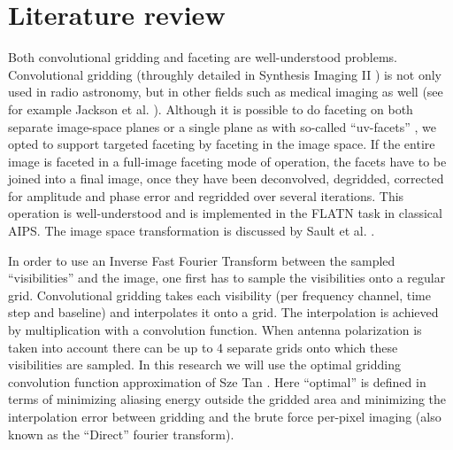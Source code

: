 \documentclass[a4paper, two column]{article}
\begin{document}
\section{Literature review}
 Both convolutional gridding and faceting are well-understood problems. Convolutional gridding (throughly detailed in Synthesis Imaging II \cite{taylor1999synthesis}) is not only used in radio astronomy, but in other fields such as 
 medical imaging as well (see for example Jackson et al. \cite{jackson1991selection}). Although it is possible to do faceting on both separate image-space planes \cite{cornwell1992radio} or a single plane as with so-called ``uv-facets'' \cite{AIPS113}, we opted to support targeted 
 faceting by faceting in the image space. If the entire image is faceted in a full-image faceting mode of operation, the facets have to be joined into a final image, once they have been deconvolved, degridded, corrected for amplitude and phase error and regridded over several iterations. 
 This operation is well-understood and is implemented in the FLATN task in classical AIPS. The image space transformation is discussed by Sault et al. \cite{sault1996approach}.
 
 In order to use an Inverse Fast Fourier Transform between the sampled ``visibilities'' and the image, one first has to sample the visibilities onto a regular grid. Convolutional gridding takes each visibility (per frequency channel, time step and baseline) 
 and interpolates it onto a grid. The interpolation is achieved by multiplication with a convolution function. When antenna polarization is taken into account there can be up to 4 separate grids onto which these visibilities are sampled. In this research we will
 use the optimal gridding convolution function approximation of Sze Tan \cite{tan1986aperture}. Here ``optimal'' is defined in terms of minimizing aliasing energy outside the gridded area and minimizing the interpolation error between gridding and the brute force per-pixel
 imaging (also known as the ``Direct'' fourier transform).
 
\end{document}
